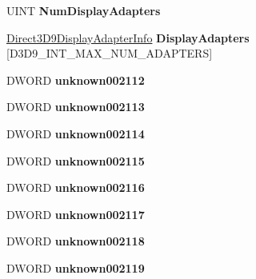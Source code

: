 \begin{DoxyCompactItemize}
U\+I\+NT {\bfseries Num\+Display\+Adapters}
\item 
\mbox{\label{struct___d_i_r_e_c_t3_d9___i_n_t_a524de4ae02a63f97783926b230a71d8a}} 
\hyperlink{struct___direct3_d9_display_adapter_info}{Direct3\+D9\+Display\+Adapter\+Info} {\bfseries Display\+Adapters} \mbox{[}D3\+D9\+\_\+\+I\+N\+T\+\_\+\+M\+A\+X\+\_\+\+N\+U\+M\+\_\+\+A\+D\+A\+P\+T\+E\+RS\mbox{]}
\item 
\mbox{\label{struct___d_i_r_e_c_t3_d9___i_n_t_a5c06406ad34cfb002bd1f1436035f115}} 
D\+W\+O\+RD {\bfseries unknown002112}
\item 
\mbox{\label{struct___d_i_r_e_c_t3_d9___i_n_t_ab412f447123be95e13e04e0b6a3d0a2d}} 
D\+W\+O\+RD {\bfseries unknown002113}
\item 
\mbox{\label{struct___d_i_r_e_c_t3_d9___i_n_t_a0d1d45f4fe7cdb70d063c876c8b34aa9}} 
D\+W\+O\+RD {\bfseries unknown002114}
\item 
\mbox{\label{struct___d_i_r_e_c_t3_d9___i_n_t_a13669fec734d944a2607a401dcba20df}} 
D\+W\+O\+RD {\bfseries unknown002115}
\item 
\mbox{\label{struct___d_i_r_e_c_t3_d9___i_n_t_a1c209a3155571696d80df76b94b86576}} 
D\+W\+O\+RD {\bfseries unknown002116}
\item 
\mbox{\label{struct___d_i_r_e_c_t3_d9___i_n_t_a4b7b06cc3b6c04c766546aa5943db667}} 
D\+W\+O\+RD {\bfseries unknown002117}
\item 
\mbox{\label{struct___d_i_r_e_c_t3_d9___i_n_t_a38ac23676c18ae6d00fdb7a112c23086}} 
D\+W\+O\+RD {\bfseries unknown002118}
\item 
\mbox{\label{struct___d_i_r_e_c_t3_d9___i_n_t_a27d839692ccabddc2a8d0c57ab010237}} 
D\+W\+O\+RD {\bfseries unknown002119}
\item 
\mbox{\label{struct___d_i_r_e_c_t3_d9___i_n_t_a150144a01cf3b31e687736bcb79c1022}} 

\end{DoxyCompactItemize}
